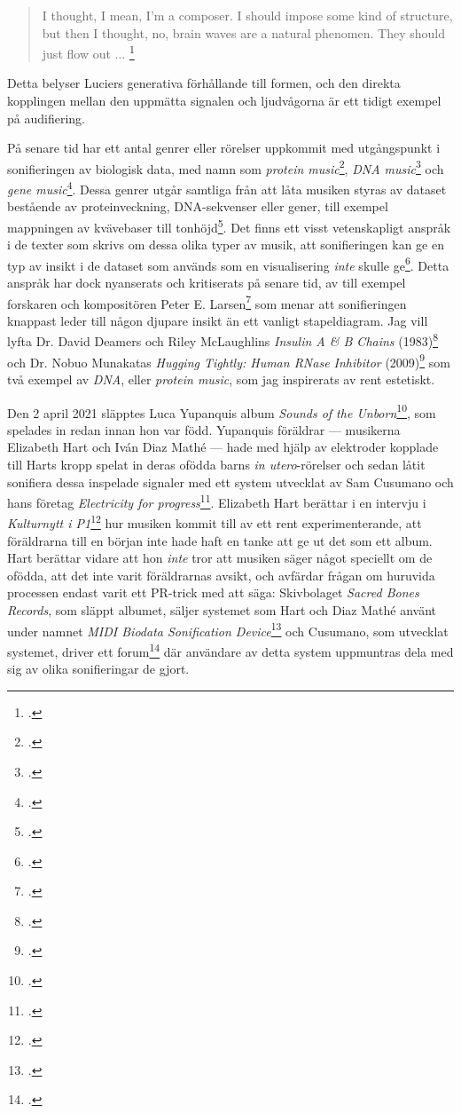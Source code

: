 \documentclass[11pt, a4paper]{article} %
\begin{document}
\begin{quote}
  I thought,  I mean, I'm a composer. I should impose some kind of structure, but then I thought, no, brain waves are a natural phenomen. They should just flow out ... \footcite{straebel_alvin_2014}
\end{quote}

Detta belyser Luciers generativa förhållande till formen, och den direkta kopplingen mellan den uppmätta signalen och ljudvågorna är ett tidigt exempel på audifiering.

På senare tid har ett antal genrer eller rörelser uppkommit med utgångspunkt i sonifieringen av biologisk data, med namn som \emph{protein music}\footcite{king_pm_1996}, \emph{DNA music}\footcite{k_kawazoe_study_2001} och \emph{gene music}\footcite{munakata_gene_1995}. Dessa genrer utgår samtliga från att låta musiken styras av dataset bestående av proteinveckning, DNA-sekvenser eller gener, till exempel mappningen av kvävebaser till tonhöjd\footcite{shi_electronic_2007}. Det finns ett visst vetenskapligt anspråk i de texter som skrivs om dessa olika typer av musik, att sonifieringen kan ge en typ av insikt i de dataset som används som en visualisering \emph{inte} skulle ge\footcite{king_pm_1996}. Detta anspråk har dock nyanserats och kritiserats på senare tid, av till exempel forskaren och kompositören Peter E. Larsen\footcite{larsen_more_2016} som menar att sonifieringen knappast leder till någon djupare insikt än ett vanligt stapeldiagram. Jag vill lyfta Dr. David Deamers och Riley McLaughlins \emph{Insulin A \& B Chains} (1983)\footcite{deamer_insulin_1983} och Dr. Nobuo Munakatas \emph{Hugging Tightly: Human RNase Inhibitor} (2009)\footcite{munakata_hugging_2009} som två exempel av \emph{DNA}, eller \emph{protein music}, som jag inspirerats av rent estetiskt.

Den 2 april 2021 släpptes Luca Yupanquis album \emph{Sounds of the Unborn}\footcite{yupanqui_sounds_2021}, som spelades in redan innan hon var född. Yupanquis föräldrar --- musikerna Elizabeth Hart och Iván Diaz Mathé --- hade med hjälp av elektroder kopplade till Harts kropp spelat in deras ofödda barns \emph{in utero}-rörelser och sedan låtit sonifiera dessa inspelade signaler med ett system utvecklat av Sam Cusumano och hans företag \emph{Electricity for progress}\footcite{noauthor_electricity_nodate}. Elizabeth Hart berättar i en intervju i \emph{Kulturnytt i P1}\footcite{eklund_duo_2021} hur musiken kommit till av ett rent experimenterande, att föräldrarna till en början inte hade haft en tanke att ge ut det som ett album. Hart berättar vidare att hon \emph{inte} tror att musiken säger något speciellt om de ofödda, att det inte varit föräldrarnas avsikt, och avfärdar frågan om huruvida processen endast varit ett PR-trick med att säga:  Skivbolaget \emph{Sacred Bones Records}, som släppt albumet, säljer systemet som Hart och Diaz Mathé använt under namnet \emph{MIDI Biodata Sonification Device}\footcite{noauthor_midi_nodate} och Cusumano, som utvecklat systemet, driver ett forum\footcite{noauthor_biodata_nodate} där användare av detta system uppmuntras dela med sig av olika sonifieringar de gjort. 
\end{document}
